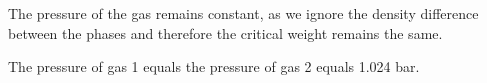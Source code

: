 The pressure of the gas remains constant, as we ignore the density difference between the phases and therefore the critical weight remains the same.

The pressure of gas 1 equals the pressure of gas 2 equals 1.024 bar.